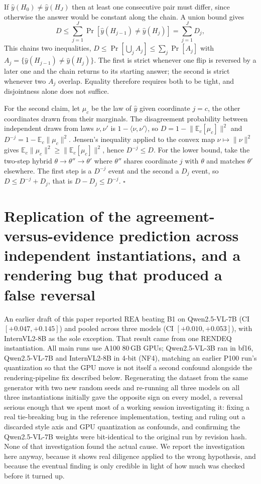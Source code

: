 \documentclass[11pt]{article}
\newcommand{\rea}{\mathrm{REA}}
\begin{document}
If $\hat y(H_0) \neq \hat y(H_J)$ then at least one consecutive pair must differ, since otherwise the answer would be constant along the chain. A union bound gives
\[
D \le \sum_{j=1}^{J} \Pr[\hat y(H_{j-1}) \neq \hat y(H_j)] = \sum_{j=1}^{J} D_j ,
\]
This chains two inequalities, $D \le \Pr[\bigcup_j A_j] \le \sum_j \Pr[A_j]$ with $A_j = \{\hat y(H_{j-1}) \neq \hat y(H_j)\}$. The first is strict whenever one flip is reversed by a later one and the chain returns to its starting answer; the second is strict whenever two $A_j$ overlap. Equality therefore requires both to be tight, and disjointness alone does not suffice.

For the second claim, let $\mu_c$ be the law of $\hat y$ given coordinate $j = c$, the other coordinates drawn from their marginals. The disagreement probability between independent draws from laws $\nu,\nu'$ is $1 - \langle \nu,\nu' \rangle$, so $D = 1 - \lVert \mathbb{E}_c[\mu_c] \rVert^2$ and $D^{-j} = 1 - \mathbb{E}_c\lVert \mu_c \rVert^2$. Jensen's inequality applied to the convex map $\nu \mapsto \lVert \nu \rVert^2$ gives $\mathbb{E}_c\lVert \mu_c \rVert^2 \ge \lVert \mathbb{E}_c[\mu_c] \rVert^2$, hence $D^{-j} \le D$. For the lower bound, take the two-step hybrid $\theta \to \theta''\to \theta'$ where $\theta''$ shares coordinate $j$ with $\theta$ and matches $\theta'$ elsewhere. The first step is a $D^{-j}$ event and the second a $D_j$ event, so $D \le D^{-j} + D_j$, that is $D - D_j \le D^{-j}$. \hfill$\square$


\section{Replication of the agreement-versus-evidence prediction across independent instantiations, and a rendering bug that produced a false reversal}
\label{app:replication}

An earlier draft of this paper reported $\rea$ beating B1 on Qwen2.5-VL-7B (CI $[+0.047,+0.145]$) and pooled across three models (CI $[+0.010,+0.053]$), with InternVL2-8B as the sole exception. That result came from one RENDEQ instantiation. All main runs use A100 80\,GB GPUs; Qwen2.5-VL-3B ran in bf16, Qwen2.5-VL-7B and InternVL2-8B in 4-bit (NF4), matching an earlier P100 run's quantization so that the GPU move is not itself a second confound alongside the rendering-pipeline fix described below. Regenerating the dataset from the same generator with two new random seeds and re-running all three models on all three instantiations initially gave the opposite sign on every model, a reversal serious enough that we spent most of a working session investigating it: fixing a real tie-breaking bug in the reference implementation, testing and ruling out a discarded style axis and GPU quantization as confounds, and confirming the Qwen2.5-VL-7B weights were bit-identical to the original run by revision hash. None of that investigation found the actual cause. We report the investigation here anyway, because it shows real diligence applied to the wrong hypothesis, and because the eventual finding is only credible in light of how much was checked before it turned up.
\end{document}
